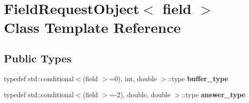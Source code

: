 \hypertarget{classFieldRequestObject}{}\section{Field\+Request\+Object$<$ field $>$ Class Template Reference}
\label{classFieldRequestObject}
\subsection*{Public Types}
\begin{DoxyCompactItemize}
\item 
\mbox{\label{classFieldRequestObject_a6ad4716d361d230f2c5d595a02834676}} 
typedef std\+::conditional$<$(field $>$=0), int, double $>$\+::type {\bfseries buffer\+\_\+type}
\item 
\mbox{\label{classFieldRequestObject_a639b3bfa2074c23a6d9931a7a2ddbc5f}} 
typedef std\+::conditional$<$(field $>$=-\/2), double, double $>$\+::type {\bfseries answer\+\_\+type}
\end{DoxyCompactItemize}

